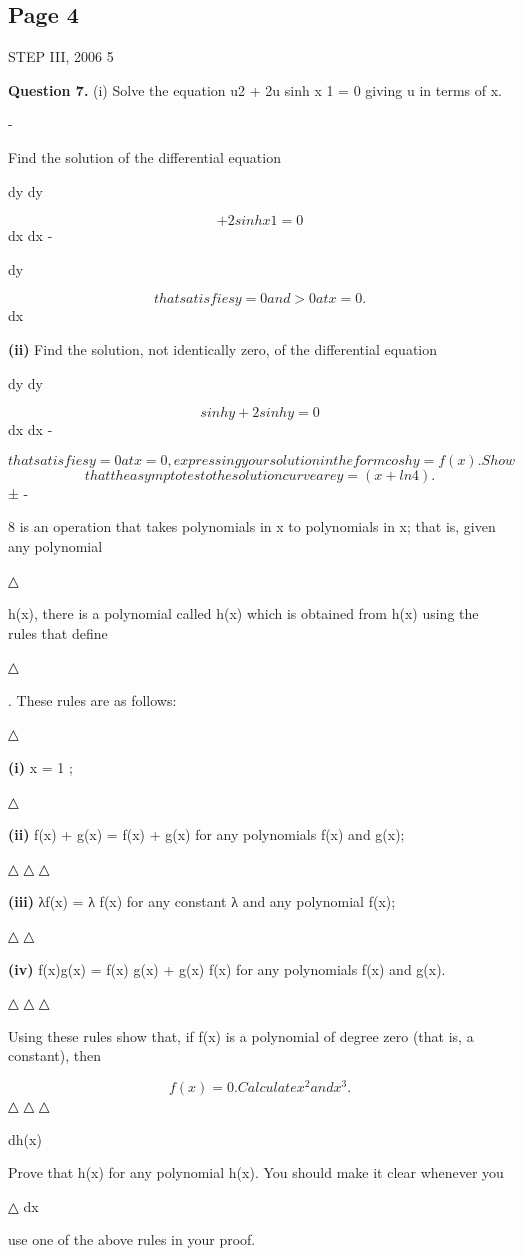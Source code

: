 \documentclass[12pt]{article}
\begin{document}
\subsection*{Page 4}
\begin{flushleft}
STEP III, 2006 5\par
\bigskip\textbf{Question 7.} (i) Solve the equation u2 + 2u sinh x 1 = 0 giving u in terms of x.\par
-\par
Find the solution of the differential equation\par
dy dy\par
\[+ 2 sinh x 1 = 0\]
\lambda dx \mu dx -\par
dy\par
\[that satisfies y = 0 and > 0 at x = 0.\]
dx\par
\textbf{(ii)} Find the solution, not identically zero, of the differential equation\par
dy dy\par
\[sinh y + 2 sinh y = 0\]
\lambda dx \mu dx -\par
\[that satisfies y = 0 at x = 0, expressing your solution in the form cosh y = f(x). Show\]
\[that the asymptotes to the solution curve are y = ( x + ln 4).\]
± -\par
8 is an operation that takes polynomials in x to polynomials in x; that is, given any polynomial\par
△\par
h(x), there is a polynomial called h(x) which is obtained from h(x) using the rules that define\par
△\par
. These rules are as follows:\par
△\par
\textbf{(i)} x = 1 ;\par
△\par
\textbf{(ii)} f(x) + g(x) = f(x) + g(x) for any polynomials f(x) and g(x);\par
△ △ △\par
\textbf{(iii)} λf(x) = λ f(x) for any constant λ and any polynomial f(x);\par
△ △\par
\textbf{(iv)} f(x)g(x) = f(x) g(x) + g(x) f(x) for any polynomials f(x) and g(x).\par
△ △ △\par
Using these rules show that, if f(x) is a polynomial of degree zero (that is, a constant), then\par
\[f(x) = 0. Calculate x^2 and x^3.\]
△ △ △\par
dh(x)\par
Prove that h(x) for any polynomial h(x). You should make it clear whenever you\par
△ \equiv dx\par
use one of the above rules in your proof.\par
\end{flushleft}
\end{document}
